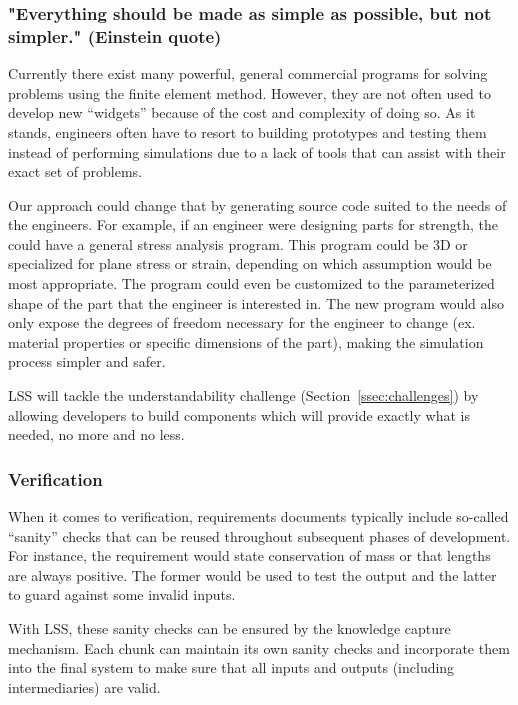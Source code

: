 \documentclass{sig-alternate-05-2015}
\newcommand{\lss}{LSS}
\begin{document}
\subsubsection{"Everything should be made as simple as possible, but not
  simpler."  (Einstein quote)} \label{sssec:adv_simple}

Currently there exist many powerful, general commercial programs for solving
problems using the finite element method. However, they are not often used to
develop new ``widgets'' because of the cost and complexity of doing so.  As it
stands, engineers often have to resort to building prototypes and testing them
instead of performing simulations due to a lack of tools that can assist with
their exact set of problems.

Our approach could change that by generating source code suited to the needs of
the engineers. For example, if an engineer were designing parts for strength,
the could have a general stress analysis program. This program could be 3D or
specialized for plane stress or strain, depending on which assumption would be
most appropriate. The program could even be customized to the parameterized
shape of the part that the engineer is interested in. The new program would also
only expose the degrees of freedom necessary for the engineer to change (ex.
material properties or specific dimensions of the part), making the simulation
process simpler and safer.

\lss{} will tackle the understandability challenge (Section~\ref{ssec:challenges})
by allowing developers to build components which will provide exactly what is
needed, no more and no less.

\subsubsection{Verification} \label{sssec:adv_verify}

When it comes to verification, requirements documents typically include
so-called ``sanity'' checks that can be reused throughout subsequent phases of
development. For instance, the requirement would state conservation of mass or
that lengths are always positive. The former would be used to test the output
and the latter to guard against some invalid inputs.

With \lss, these sanity checks can be ensured by the knowledge capture
mechanism. Each chunk can maintain its own sanity checks and incorporate them
into the final system to make sure that all inputs and outputs (including
intermediaries) are valid.
\end{document}
